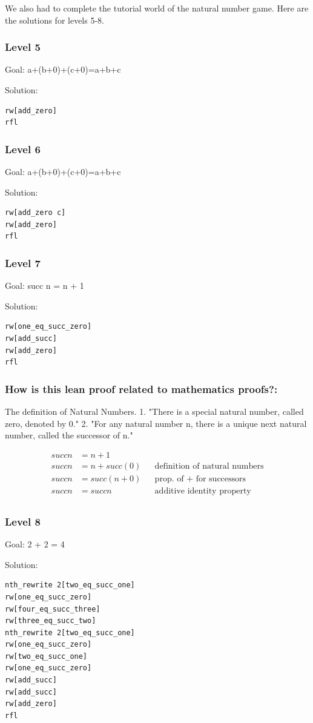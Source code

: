 \documentclass{article}
\theoremstyle{theorem}
\theoremstyle{definition}
\theoremstyle{remark}
\begin{document}
We also had to complete the tutorial world of the natural number game. 
Here are the solutions for levels 5-8.

\subsubsection*{Level 5}
Goal: a+(b+0)+(c+0)=a+b+c

Solution:
\begin{lstlisting}
rw[add_zero]
rfl
\end{lstlisting}
\subsubsection*{Level 6}
Goal: a+(b+0)+(c+0)=a+b+c

Solution:
\begin{lstlisting}
rw[add_zero c]
rw[add_zero]
rfl
\end{lstlisting}
\subsubsection*{Level 7}
Goal: succ n = n + 1

Solution:
\begin{lstlisting}
rw[one_eq_succ_zero]
rw[add_succ]
rw[add_zero]
rfl
\end{lstlisting}
\subsubsection*{How is this lean proof related to mathematics proofs?:}
The definition of Natural Numbers. 
1. "There is a special natural number, called zero, denoted by 0."
2. "For any natural number n, there is a unique next natural number, called
the successor of n."

\begin{align}
succ n &= n + 1         &   \\
succ n &= n + succ(0)   &    &\text{definition of natural numbers} \\
succ n &= succ(n + 0)   &    &\text{prop. of + for successors} \\
succ n &= succ n        &    &\text{additive identity property} \\
\end{align}
\subsubsection*{Level 8}
Goal: 2 + 2 = 4

Solution:
\begin{lstlisting}
nth_rewrite 2[two_eq_succ_one]
rw[one_eq_succ_zero]
rw[four_eq_succ_three]
rw[three_eq_succ_two]
nth_rewrite 2[two_eq_succ_one]
rw[one_eq_succ_zero]
rw[two_eq_succ_one]
rw[one_eq_succ_zero]
rw[add_succ]
rw[add_succ]
rw[add_zero]
rfl
\end{lstlisting}
\end{document}
